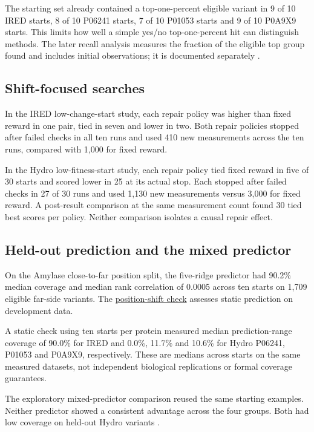 \documentclass[11pt,a4paper]{article}
\begin{document}
The starting set already contained a top-one-percent eligible variant in 9 of 10 IRED starts, 8 of 10 P06241 starts, 7 of 10 P01053 starts and 9 of 10 P0A9X9 starts. This limits how well a simple yes/no top-one-percent hit can distinguish methods. The later recall analysis measures the fraction of the eligible top group found and includes initial observations; it is documented separately \cite{metrics}.

\subsection{Shift-focused searches}
In the IRED low-change-start study, each repair policy was higher than fixed reward in one pair, tied in seven and lower in two. Both repair policies stopped after failed checks in all ten runs and used 410 new measurements across the ten runs, compared with 1,000 for fixed reward.

In the Hydro low-fitness-start study, each repair policy tied fixed reward in five of 30 starts and scored lower in 25 at its actual stop. Each stopped after failed checks in 27 of 30 runs and used 1,130 new measurements versus 3,000 for fixed reward. A post-result comparison at the same measurement count found 30 tied best scores per policy. Neither comparison isolates a causal repair effect.

\subsection{Held-out prediction and the mixed predictor}
On the Amylase close-to-far position split, the five-ridge predictor had 90.2\% median coverage and median rank correlation of 0.0005 across ten starts on 1,709 eligible far-side variants. The \href{../../research/amylase_position_shift_findings.md}{position-shift check} assesses static prediction on development data.

A static check using ten starts per protein measured median prediction-range coverage of 90.0\% for IRED and 0.0\%, 11.7\% and 10.6\% for Hydro P06241, P01053 and P0A9X9, respectively. These are medians across starts on the same measured datasets, not independent biological replications or formal coverage guarantees.

The exploratory mixed-predictor comparison reused the same starting examples. Neither predictor showed a consistent advantage across the four groups. Both had low coverage on held-out Hydro variants \cite{mixed}.

\newpage
\end{document}
